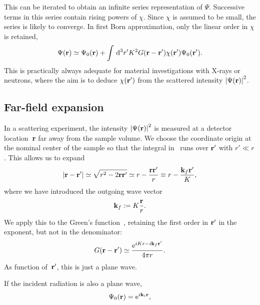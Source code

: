This can be iterated to obtain an infinite series representation of $\Psi$.
Successive terms in this series contain rising powers of $\chi$.
Since $\chi$ is assumed to be small, the series is likely to converge.
In first Born approximation,
only the linear order in $\chi$ is retained,
\begin{equation}\label{eq:Born}
  \Psi(\mathbf{r})
  \simeq \Psi_0(\mathbf{r})
  + \int\,{\rm d}^3r' K^2G(\mathbf{r}-\mathbf{r'})\chi(\mathbf{r'})\Psi_0(\mathbf{r'}).
\end{equation}
This is practically always adequate for
material investigations with X-rays or neutrons,
where the aim is to 
deduce $\chi(\mathbf{r'})$ from the scattered intensity ${|\Psi(\mathbf{r})|}^2$.

\subsection{Far-field expansion}

In a scattering experiment,
the intensity ${|\Psi(\mathbf{r})|}^2$ is measured
at a detector location~$\mathbf{r}$
far away from the sample volume.
We choose the coordinate origin at the nominal center of the sample
so that the integral in~ runs over $\mathbf{r'}$ with $r'\ll r$.
This allows us to expand
\begin{equation}
  \left|\mathbf{r}-\mathbf{r'}\right|
  \simeq \sqrt{r^2-2\mathbf{r}\mathbf{r'}}
  \simeq r - \frac{\mathbf{r}\mathbf{r'}}{r}
  \equiv r - \frac{\mathbf{k}_f \mathbf{r'}}{K},
\end{equation}
where we have introduced the outgoing wave vector
\begin{equation}
  \mathbf{k}_f:=K\frac{\mathbf{r}}{r}.
\end{equation}
We apply this to the Green's function~,
retaining the first order in $\mathbf{r'}$ in the exponent,
but not in the denominator:
\begin{equation}
  G(\mathbf{r}-\mathbf{r'})
  \simeq\frac{{\rm e}^{iKr - i\mathbf{k}_f \mathbf{r'}}}{4\pi r}.
\end{equation}
As function of~$\mathbf{r'}$, this is just a plane wave.

If the incident radiation is also a plane wave,
\begin{equation}
  \Psi_0(\mathbf{r})={\rm e}^{i \mathbf{k}_i \mathbf{r}},
\end{equation}

